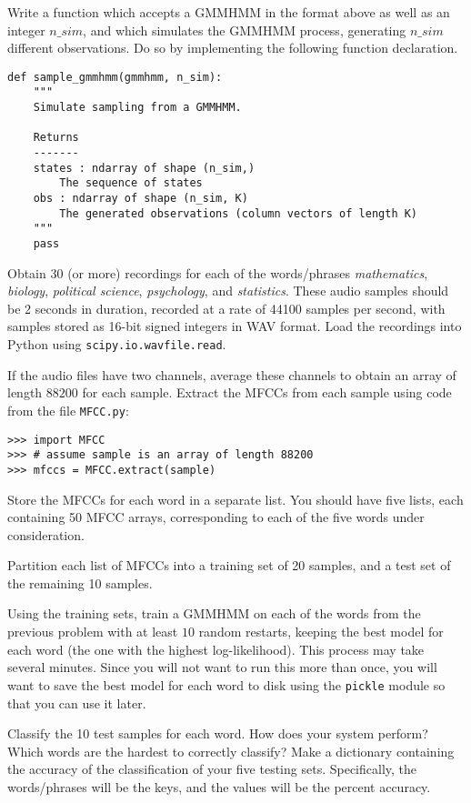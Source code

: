 
Write a function which accepts a GMMHMM in the format above as well as an integer $n\_sim$, and which simulates the GMMHMM process, generating $n\_sim$ different observations.
Do so by implementing the following function declaration.
\begin{lstlisting}
def sample_gmmhmm(gmmhmm, n_sim):
    """
    Simulate sampling from a GMMHMM.

    Returns
    -------
    states : ndarray of shape (n_sim,)
        The sequence of states
    obs : ndarray of shape (n_sim, K)
        The generated observations (column vectors of length K)
    """
    pass
\end{lstlisting}

Obtain $30$ (or more) recordings for each of the words/phrases \emph{mathematics}, \emph{biology}, \emph{political science}, \emph{psychology}, and \emph{statistics}.
These audio samples should be 2 seconds in duration, recorded at a rate of 44100 samples per second, with samples stored as 16-bit signed integers in WAV format.
Load the recordings into Python using {\tt scipy.io.wavfile.read}.

If the audio files have two channels, average these channels to obtain an array of length $88200$ for each sample.
Extract the MFCCs from each sample using code from the file {\tt MFCC.py}:
\begin{lstlisting}
>>> import MFCC
>>> # assume sample is an array of length 88200
>>> mfccs = MFCC.extract(sample)
\end{lstlisting}
Store the MFCCs for each word in a separate list. You should have five lists, each containing 50 MFCC arrays, corresponding to each of the five words
under consideration.

Partition each list of MFCCs into a training set of 20 samples, and a test set of the remaining 10 samples.

Using the training sets, train a GMMHMM on each of the words from the previous problem with at least $10$ random restarts, keeping the best model for each word (the one with the highest log-likelihood).
This process may take several minutes.  Since you will not want to run this more than once, you will want to save the best model for each word to disk using the {\tt pickle} module so that you can use it later.

Classify the 10 test samples for each word. 
How does your system perform? Which words are the hardest to correctly classify?
Make a dictionary containing the accuracy of the classification of your five testing sets.  Specifically, the words/phrases will be the keys, and the values will be the percent accuracy. 

